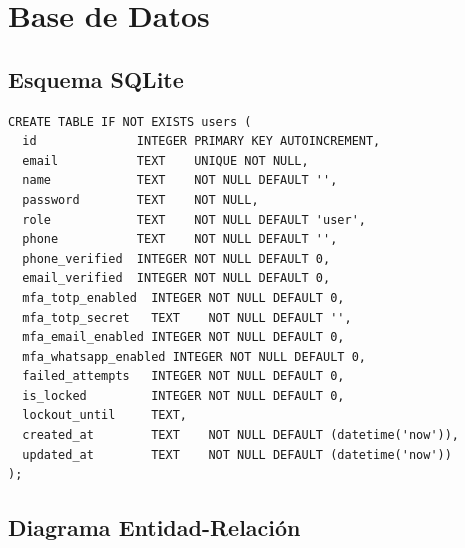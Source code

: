 \documentclass[12pt,a4paper,openany]{article}
\begin{document}
\section{Base de Datos}

\subsection{Esquema SQLite}

\begin{lstlisting}[style=sqlstyle, caption={Esquema de la tabla users}]
CREATE TABLE IF NOT EXISTS users (
  id              INTEGER PRIMARY KEY AUTOINCREMENT,
  email           TEXT    UNIQUE NOT NULL,
  name            TEXT    NOT NULL DEFAULT '',
  password        TEXT    NOT NULL,
  role            TEXT    NOT NULL DEFAULT 'user',
  phone           TEXT    NOT NULL DEFAULT '',
  phone_verified  INTEGER NOT NULL DEFAULT 0,
  email_verified  INTEGER NOT NULL DEFAULT 0,
  mfa_totp_enabled  INTEGER NOT NULL DEFAULT 0,
  mfa_totp_secret   TEXT    NOT NULL DEFAULT '',
  mfa_email_enabled INTEGER NOT NULL DEFAULT 0,
  mfa_whatsapp_enabled INTEGER NOT NULL DEFAULT 0,
  failed_attempts   INTEGER NOT NULL DEFAULT 0,
  is_locked         INTEGER NOT NULL DEFAULT 0,
  lockout_until     TEXT,
  created_at        TEXT    NOT NULL DEFAULT (datetime('now')),
  updated_at        TEXT    NOT NULL DEFAULT (datetime('now'))
);
\end{lstlisting}

\subsection{Diagrama Entidad-Relación}
\end{document}
